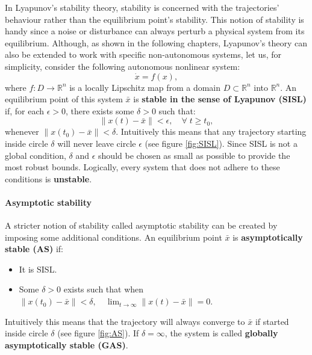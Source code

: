 In Lyapunov's stability theory, stability is concerned with the trajectories' behaviour rather than the equilibrium point's stability. This notion of stability is handy since a noise or disturbance can always perturb a physical system from its equilibrium. Although, as shown in the following chapters, Lyapunov's theory can also be extended to work with specific non-autonomous systems, let us, for simplicity, consider the following autonomous nonlinear system:
\begin{equation} \label{eq:auto_nonlinear_system}
  \dot{x} = f\left(x\right),
\end{equation}
where $f : D \rightarrow\mathbb{R}^n$ is a locally Lipschitz map from a domain $D \subset \mathbb{R}^n$ into $\mathbb{R}^n$. An equilibrium point of this system $\bar{x}$ is \textbf{stable in the sense of Lyapunov (SISL)} if, for each $\epsilon > 0$, there exists some $\delta > 0$ such that:
\begin{equation}
  \left\| x\left(t\right) - \bar{x} \right\| < \epsilon, \quad \forall \; t \ge t_0,
\end{equation}
whenever $\left\| x\left(t_0\right) - \bar{x} \right\| < \delta$. Intuitively this means that any trajectory starting inside circle $\delta$ will never leave circle $\epsilon$ (see figure \ref{fig:SISL}). Since SISL is not a global condition, $\delta$ and $\epsilon$ should be chosen as small as possible to provide the most robust bounds. Logically, every system that does not adhere to these conditions is \textbf{unstable}.

\paragraph{Asymptotic stability}

A stricter notion of stability called asymptotic stability can be created by imposing some additional conditions. An equilibrium point $\bar{x}$ is \textbf{asymptotically stable (AS)} if:
\begin{itemize}
  \item It is SISL.
  \item Some $\delta > 0$ exists such that when $\left\| x\left(t_0\right) - \bar{x} \right\| < \delta, \quad \lim_{t \to \infty} \left\| x\left(t\right) - \bar{x} \right\| = 0$.
\end{itemize}
Intuitively this means that the trajectory will always converge to $\bar{x}$ if started inside circle $\delta$ (see figure \ref{fig:AS}). If $\delta = \infty$, the system is called \textbf{globally asymptotically stable (GAS)}.


